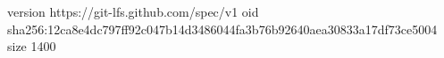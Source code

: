 version https://git-lfs.github.com/spec/v1
oid sha256:12ca8e4dc797ff92c047b14d3486044fa3b76b92640aea30833a17df73ce5004
size 1400
